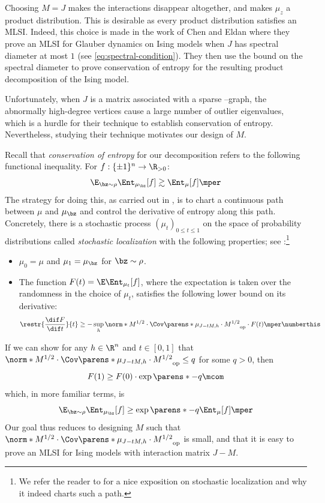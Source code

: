 \documentclass[11pt,letterpaper]{article}
\begin{document}
Choosing $M = J$ makes the interactions disappear altogether, and makes $\mu_z$ a product distribution.
This is desirable as every product distribution satisfies an MLSI.
Indeed, this choice is made in the work of Chen and Eldan \cite[Corollary 51]{CE22} where they prove an MLSI for Glauber dynamics on Ising models when $J$ has spectral diameter at most $1$ (see \cref{eq:spectral-condition}).
They then use the bound on the spectral diameter to prove conservation of entropy for the resulting product decomposition of the Ising model.

Unfortunately, when $J$ is a matrix associated with a sparse \erdos--\renyi graph, the abnormally high-degree vertices cause a large number of outlier eigenvalues, which is a hurdle for their technique to establish conservation of entropy.
Nevertheless, studying their technique motivates our design of $M$.

Recall that \emph{conservation of entropy} for our decomposition refers to the following functional inequality.
For $f:\{\pm1\}^n\to\R_{>0}$: 
\[
    \E_{\bz\sim\rho} \Ent_{\mu_{\bz}}[f] \gtrsim \Ent_{\mu}[f]\mper
\]
The strategy for doing this, as carried out in \cite{EKZ22,CE22}, is to chart a continuous path between $\mu$ and $\mu_{\bz}$ and control the derivative of entropy along this path.
Concretely, there is a stochastic process $(\mu_t)_{0\le t\le 1}$ on the space of probability distributions called \emph{stochastic localization} with the following properties; see \cite[Proposition 39 and Lemma 40]{CE22}:\footnote{We refer the reader to \cite{EAM22} for a nice exposition on stochastic localization and why it indeed charts such a path.}
\begin{itemize}
    \item $\mu_0 = \mu$ and $\mu_1 = \mu_{\bz}$ for $\bz\sim\rho$.
    \item The function $F(t) = \E \Ent_{\mu_t}[f]$, where the expectation is taken over the randomness in the choice of $\mu_{t}$, satisfies the following lower bound on its derivative:
    \[
        \restr{\frac{\dif F}{\dif t}}{t} \ge -\sup_{h}\norm*{M^{1/2}\cdot\Cov\parens*{\mu_{J-tM,h}}\cdot M^{1/2}}_{\mathrm{op}} \cdot F(t)\mper \numberthis \label{eq:deriv-sl}
    \]
\end{itemize}
If we can show for any $h \in \R^{n}$ and $t\in[0,1]$ that $\norm*{M^{1/2}\cdot\Cov\parens*{\mu_{J-tM, h}}\cdot M^{1/2}}_{\mathrm{op}}\le q$ for some $q > 0$, then
\[
    F(1) \ge F(0)\cdot\exp\parens*{-q}\mcom
\]
which, in more familiar terms, is
\[
    \E_{\bz\sim\rho} \Ent_{\mu_{\bz}}[f] \ge \exp\parens*{-q} \Ent_{\mu}[f]\mper
\]
Our goal thus reduces to designing $M$ such that $\norm*{M^{1/2}\cdot\Cov\parens*{\mu_{J-tM,h}} \cdot M^{1/2}}_{\mathrm{op}}$ is small, and that it is easy to  prove an MLSI for Ising models with interaction matrix $J-M$.
\end{document}
